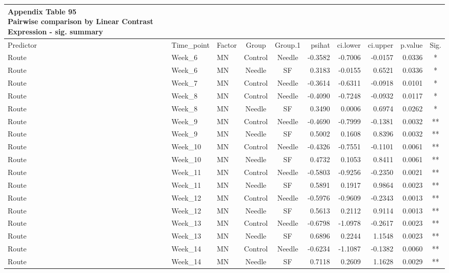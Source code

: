 \documentclass[
  12pt,
  letterpaper,
]{article}
\begin{document}
\begin{longtable}{lllccrrrrc}
\caption*{
{\large \textbf{Appendix Table 95}} \\ 
{\small \textbf{Pairwise comparison by Linear Contrast Expression - sig. summary}}
} \\ 
\toprule
{Predictor} & Time\_point & {Factor} & {Group} & {Group.1} & {psihat} & {ci.lower} & {ci.upper} & {p.value} & {Sig.} \\ 
\midrule\addlinespace[2.5pt]
Route & Week\_6 & MN & Control & Needle & -0.3582 & -0.7006 & -0.0157 & 0.0336 & * \\ 
Route & Week\_6 & MN & Needle & SF & 0.3183 & -0.0155 & 0.6521 & 0.0336 & * \\ 
Route & Week\_7 & MN & Control & Needle & -0.3614 & -0.6311 & -0.0918 & 0.0101 & * \\ 
Route & Week\_8 & MN & Control & Needle & -0.4090 & -0.7248 & -0.0932 & 0.0117 & * \\ 
Route & Week\_8 & MN & Needle & SF & 0.3490 & 0.0006 & 0.6974 & 0.0262 & * \\ 
Route & Week\_9 & MN & Control & Needle & -0.4690 & -0.7999 & -0.1381 & 0.0032 & ** \\ 
Route & Week\_9 & MN & Needle & SF & 0.5002 & 0.1608 & 0.8396 & 0.0032 & ** \\ 
Route & Week\_10 & MN & Control & Needle & -0.4326 & -0.7551 & -0.1101 & 0.0061 & ** \\ 
Route & Week\_10 & MN & Needle & SF & 0.4732 & 0.1053 & 0.8411 & 0.0061 & ** \\ 
Route & Week\_11 & MN & Control & Needle & -0.5803 & -0.9256 & -0.2350 & 0.0021 & ** \\ 
Route & Week\_11 & MN & Needle & SF & 0.5891 & 0.1917 & 0.9864 & 0.0023 & ** \\ 
Route & Week\_12 & MN & Control & Needle & -0.5976 & -0.9609 & -0.2343 & 0.0013 & ** \\ 
Route & Week\_12 & MN & Needle & SF & 0.5613 & 0.2112 & 0.9114 & 0.0013 & ** \\ 
Route & Week\_13 & MN & Control & Needle & -0.6798 & -1.0978 & -0.2617 & 0.0023 & ** \\ 
Route & Week\_13 & MN & Needle & SF & 0.6896 & 0.2244 & 1.1548 & 0.0023 & ** \\ 
Route & Week\_14 & MN & Control & Needle & -0.6234 & -1.1087 & -0.1382 & 0.0060 & ** \\ 
Route & Week\_14 & MN & Needle & SF & 0.7118 & 0.2609 & 1.1628 & 0.0029 & ** \\ 

\end{longtable}
\end{document}
